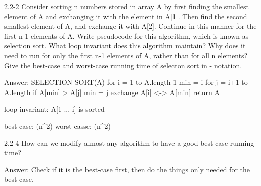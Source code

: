 2.2-2
Consider sorting n numbers stored in array A by first finding the smallest element of A and exchanging it with the element in A[1]. Then find the second  smallest element of A, and exchange it with A[2]. Continue in this manner for the first n-1 elements of A. Write pseudocode for this algorithm, which is known as selection sort. What loop invariant does this algorithm maintain? Why does it need  to run for only the first n-1 elements of A, rather than for all n elements? Give the best-case and worst-case running time of selecton sort in \Theta - notation.

Answer:
SELECTION-SORT(A)
  for i = 1 to A.length-1
    min = i
    for j = i+1 to A.length
      if A[min] > A[j]
        min = j
    exchange A[i] <-> A[min]
  return A
  
loop invariant: A[1 ... i] is sorted
  
best-case: \Theta(n^2)
worst-casse: \Theta(n^2)

2.2-4
How can we modify almost any algorithm to have a good best-case running time?

Answer:
  Check if it is the best-case first, then do the things only needed for the best-case.
